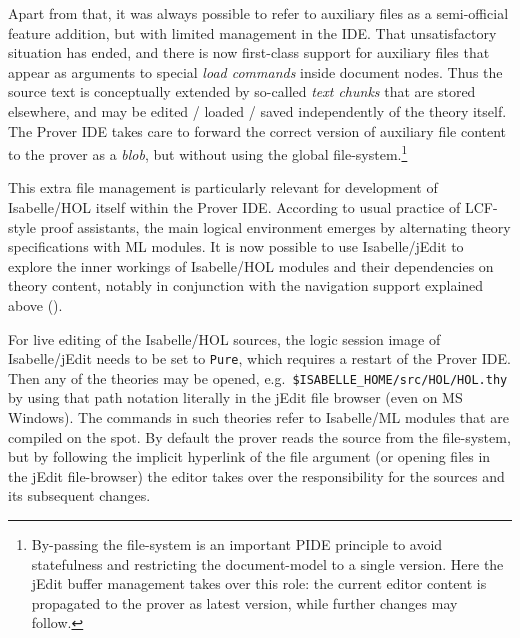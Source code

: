 \begin{isabellebody}
\begin{isamarkuptext}
Apart from that, it was always possible to refer to auxiliary files as a
semi-official feature addition, but with limited management in the IDE. That
unsatisfactory situation has ended, and there is now first-class support for
auxiliary files that appear as arguments to special \emph{load commands}
inside document nodes. Thus the source text is conceptually extended by
so-called \emph{text chunks} that are stored elsewhere, and may be edited /
loaded / saved independently of the theory itself. The Prover IDE takes care
to forward the correct version of auxiliary file content to the prover as a
\emph{blob}, but without using the global file-system.\footnote{By-passing
the file-system is an important PIDE principle to avoid statefulness and
restricting the document-model to a single version. Here the jEdit buffer
management takes over this role: the current editor content is propagated to
the prover as latest version, while further changes may follow.}

\medskip This extra file management is particularly relevant for development
of Isabelle/HOL itself within the Prover IDE. According to usual practice of
LCF-style proof assistants, the main logical environment emerges by
alternating theory specifications with ML modules. It is now possible to use
Isabelle/jEdit to explore the inner workings of Isabelle/HOL modules and
their dependencies on theory content, notably in conjunction with the
navigation support explained above ().

For live editing of the Isabelle/HOL sources, the logic session image of
Isabelle/jEdit needs to be set to \verb|Pure|, which requires a restart
of the Prover IDE. Then any of the theories may be opened, e.g.\ \verb|$ISABELLE_HOME|\verb|/|\discretionary{}{}{}\verb|src|\verb|/|\discretionary{}{}{}\verb|HOL|\verb|/|\discretionary{}{}{}\verb|HOL.thy| by using that path notation literally in
the jEdit file browser (even on MS Windows). The \hyperlink{command.ML-file}{\mbox{}} commands
in such theories refer to Isabelle/ML modules that are compiled on the spot.
By default the prover reads the source from the file-system, but by
following the implicit hyperlink of the file argument (or opening files in
the jEdit file-browser) the editor takes over the responsibility for the
sources and its subsequent changes.


\end{isamarkuptext}
\end{isabellebody}

